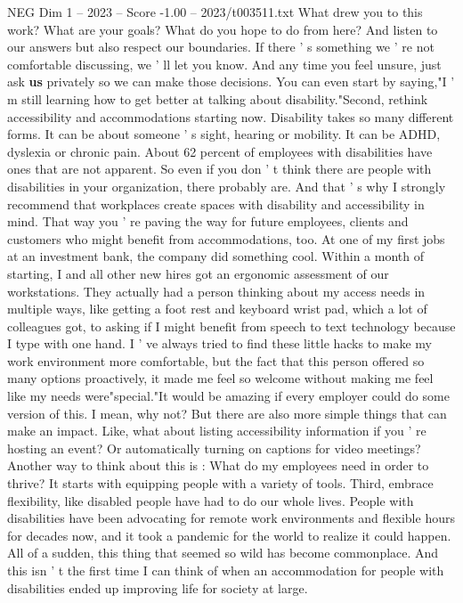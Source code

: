 \begin{textsample}{NEG Dim 1 – 2023 – Score -1.00 – 2023/t003511.txt}
What drew you to this work?
What are your goals?
What do you hope to do from here?
And listen to our answers but also respect our boundaries.
If there ' s something we ' re not comfortable discussing, we ' ll let you know.
And any time you feel unsure, just ask \textbf{us} privately so we can make those decisions.
You can even start by saying,"I ' m still learning how to get better at talking about disability."Second, rethink accessibility and accommodations starting now.
Disability takes so many different forms.
It can be about someone ' s sight, hearing or mobility.
It can be ADHD, dyslexia or chronic pain.
About 62 percent of employees with disabilities have ones that are not apparent.
So even if you don ' t think there are people with disabilities in your organization, there probably are.
And that ' s why I strongly recommend that workplaces create spaces with disability and accessibility in mind.
That way you ' re paving the way for future employees, clients and customers who might benefit from accommodations, too.
At one of my first jobs at an investment bank, the company did something cool.
Within a month of starting, I and all other new hires got an ergonomic assessment of our workstations.
They actually had a person thinking about my access needs in multiple ways, like getting a foot rest and keyboard wrist pad, which a lot of colleagues got, to asking if I might benefit from speech to text technology because I type with one hand.
I ' ve always tried to find these little hacks to make my work environment more comfortable, but the fact that this person offered so many options proactively, it made me feel so welcome without making me feel like my needs were"special."It would be amazing if every employer could do some version of this.
I mean, why not?
But there are also more simple things that can make an impact.
Like, what about listing accessibility information if you ' re hosting an event?
Or automatically turning on captions for video meetings?
Another way to think about this is : What do my employees need in order to thrive?
It starts with equipping people with a variety of tools.
Third, embrace flexibility, like disabled people have had to do our whole lives.
People with disabilities have been advocating for remote work environments and flexible hours for decades now, and it took a pandemic for the world to realize it could happen.
All of a sudden, this thing that seemed so wild has become commonplace.
And this isn ' t the first time I can think of when an accommodation for people with disabilities ended up improving life for society at large.

\end{textsample}
